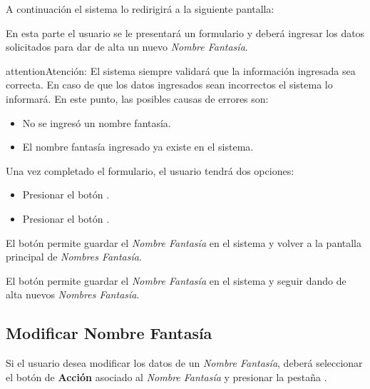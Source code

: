 \documentclass[a4paper,10pt,spanish]{sphinxmanual}
\begin{document}

A continuación el sistema lo redirigirá a la siguiente pantalla:


En esta parte el usuario se le presentará un formulario y deberá ingresar los datos solicitados para dar de alta un nuevo \emph{Nombre Fantasía}.

\begin{notice}{attention}{Atención:}
El sistema siempre validará que la información ingresada sea correcta. En caso de que los datos ingresados sean incorrectos el sistema lo informará.
En este punto, las posibles causas de errores son:
\begin{itemize}
\item {} 
No se ingresó un nombre fantasía.

\item {} 
El nombre fantasía ingresado ya existe en el sistema.

\end{itemize}
\end{notice}

Una vez completado el formulario, el usuario tendrá dos opciones:
\begin{itemize}
\item {} 
Presionar el botón .

\item {} 
Presionar el botón .

\end{itemize}

El botón  permite guardar el \emph{Nombre Fantasía} en el sistema y volver a la pantalla
principal de \emph{Nombres Fantasía}.

El botón  permite guardar el \emph{Nombre Fantasía} en el sistema y seguir dando de alta nuevos \emph{Nombres Fantasía}.


\subsection{Modificar Nombre Fantasía}
\label{nombresfantasia:id2}\label{nombresfantasia:modificar-nombre-fantasia}
Si el usuario desea modificar los datos de un \emph{Nombre Fantasía}, deberá seleccionar el botón de \textbf{Acción} asociado al \emph{Nombre Fantasía} y presionar la pestaña .
\end{document}
